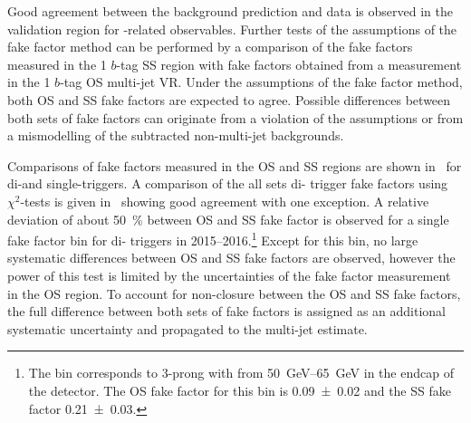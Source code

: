 Good agreement between the background prediction and data is observed
in the validation region for \tauhadvis-related observables. Further
tests of the assumptions of the fake factor method can be performed by
a comparison of the fake factors measured in the 1 $b$-tag SS region
with fake factors obtained from a measurement in the 1 $b$-tag OS
multi-jet VR. Under the assumptions of the fake factor method, both OS
and SS fake factors are expected to agree. Possible differences
between both sets of fake factors can originate from a violation of
the assumptions or from a mismodelling of the subtracted non-multi-jet
backgrounds.

Comparisons of fake factors measured in the OS and SS regions are
shown in~ for di-\tauhadvis and
single-\tauhadvis triggers. A comparison of the all sets di-\tauhadvis
trigger fake factors using $\chi^2$-tests is given
in~ showing good agreement with
one exception. %
A relative deviation of about \SI{50}{\percent} between OS and SS fake
factor is observed for a single fake factor bin for di-\tauhadvis
triggers in 2015--2016.\footnote{The bin corresponds to 3-prong
  \tauhadvis with \pT from \SIrange{50}{65}{\GeV} in the endcap of the
  detector. The OS fake factor for this bin is \num{0.09 +- 0.02} and
  the SS fake factor \num{0.21 +- 0.03}.} Except for this bin, no
large systematic differences between OS and SS fake factors are
observed, however the power of this test is limited by the
uncertainties of the fake factor measurement in the OS region. To
account for non-closure between the OS and SS fake factors, the full
difference between both sets of fake factors is assigned as an
additional systematic uncertainty and propagated to the multi-jet
estimate.


